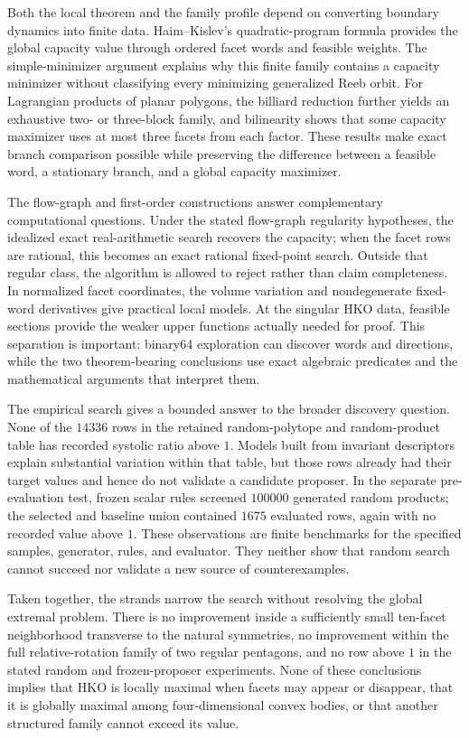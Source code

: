 Both the local theorem and the family profile depend on converting boundary
dynamics into finite data.  Haim--Kislev's quadratic-program formula
\cite{HK2017} provides the global capacity value through ordered facet words
and feasible weights.  The simple-minimizer argument explains why this finite
family contains a capacity minimizer without classifying every minimizing
generalized Reeb orbit.  For Lagrangian products of planar polygons, the
billiard reduction further yields an exhaustive two- or three-block family,
and bilinearity shows that some capacity maximizer uses at most three facets
from each factor.  These results make exact branch comparison possible while
preserving the difference between a feasible word, a stationary branch, and a
global capacity maximizer.

The flow-graph and first-order constructions answer complementary
computational questions.  Under the stated flow-graph regularity hypotheses,
the idealized exact real-arithmetic search recovers the capacity; when the
facet rows are rational, this becomes an exact rational fixed-point search.
Outside that regular class, the algorithm is allowed to reject rather than
claim completeness.  In normalized facet coordinates, the
volume variation and nondegenerate fixed-word derivatives give practical
local models.  At the singular HKO data, feasible sections provide the weaker
upper functions actually needed for proof.  This separation is important:
binary64 exploration can discover words and directions, while the two
theorem-bearing conclusions use exact algebraic predicates and the
mathematical arguments that interpret them.

The empirical search gives a bounded answer to the broader discovery
question.  None of the \(14336\) rows in the retained random-polytope and
random-product table has recorded systolic ratio above \(1\).  Models built
from invariant descriptors explain substantial variation within that table,
but those rows already had their target values and hence do not validate a
candidate proposer.  In the separate pre-evaluation test, frozen scalar rules
screened \(100000\) generated random products; the selected and baseline union
contained \(1675\) evaluated rows, again with no recorded value above \(1\).
These observations are finite benchmarks for the specified samples,
generator, rules, and evaluator.  They neither show that random search cannot
succeed nor validate a new source of counterexamples.

Taken together, the strands narrow the search without resolving the global
extremal problem.  There is no improvement inside a sufficiently small
ten-facet neighborhood transverse to the natural symmetries, no improvement
within the full relative-rotation family of two regular pentagons, and no
row above \(1\) in the stated random and frozen-proposer experiments.  None
of these conclusions implies that HKO is locally maximal when facets may
appear or disappear, that it is globally maximal among four-dimensional
convex bodies, or that another structured family cannot exceed its value.


